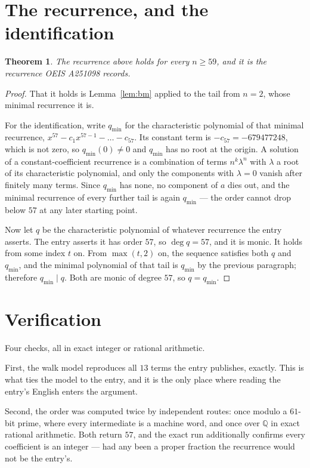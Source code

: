 \documentclass[11pt,a4paper]{article}
\theoremstyle{plain}
\newtheorem{theorem}{Theorem}
\theoremstyle{definition}
\begin{document}
\section{The recurrence, and the identification}

\begin{theorem}
The recurrence above holds for every $n\ge59$, and it is the recurrence OEIS A251098 records.
\end{theorem}

\begin{proof}
That it holds is Lemma~\ref{lem:bm} applied to the tail from $n=2$, whose minimal
recurrence it is.

For the identification, write $q_{\min}$ for the characteristic polynomial of that minimal
recurrence, $x^{57}-c_1x^{57-1}-\dots-c_{57}$. Its constant term is
$-c_{57}=-679477248$, which is not zero, so $q_{\min}(0)\neq0$ and $q_{\min}$ has no
root at the origin. A solution of a constant-coefficient recurrence is a combination of terms
$n^{k}\lambda^{n}$ with $\lambda$ a root of its characteristic polynomial, and only the
components with $\lambda=0$ vanish after finitely many terms. Since $q_{\min}$ has none, no
component of $a$ dies out, and the minimal recurrence of every further tail is again
$q_{\min}$ --- the order cannot drop below $57$ at any later starting point.

Now let $q$ be the characteristic polynomial of whatever recurrence the entry asserts. The
entry asserts it has order $57$, so $\deg q=57$, and it is monic. It holds from some
index $t$ on. From $\max(t,2)$ on, the sequence satisfies both $q$ and $q_{\min}$, and
the minimal polynomial of that tail is $q_{\min}$ by the previous paragraph; therefore
$q_{\min}\mid q$. Both are monic of degree $57$, so $q=q_{\min}$.
\end{proof}

\section{Verification}

Four checks, all in exact integer or rational arithmetic.

First, the walk model reproduces all $13$ terms the entry publishes, exactly. This is
what ties the model to the entry, and it is the only place where reading the entry's English
enters the argument.

Second, the order was computed twice by independent routes: once modulo a $61$-bit prime, where
every intermediate is a machine word, and once over $\mathbb{Q}$ in exact rational arithmetic.
Both return $57$, and the exact run additionally confirms every coefficient is an integer
--- had any been a proper fraction the recurrence would not be the entry's.
\end{document}
